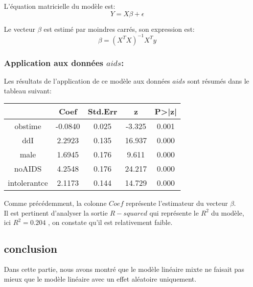 \documentclass{article}
\begin{document}
L'équation matricielle du modèle est:\\
\[Y = X \beta  + \epsilon\]

Le vecteur $\beta$ est estimé par moindres carrés, son expression est: 
\[\beta = (X^T X)^{-1} X^T y\]

\subsubsection{Application aux données $aids$:}

Les résultats de l'application de ce modèle aux données $aids$ sont résumés dans le tableau suivant:
\begin{center}
    \begin{tabular}{|c|c|c|c|c|}
    \hline
         & Coef & Std.Err & z & P>|z|   \\
         \hline 
         obstime & -0.0840 & 0.025 & -3.325 & 0.001\\
         ddI & 2.2923 & 0.135 & 16.937 & 0.000 \\
         male & 1.6945 & 0.176 & 9.611 & 0.000\\
         noAIDS &4.2548 & 0.176 & 24.217 & 0.000\\
         intolerantce  & 2.1173 & 0.144 & 14.729 & 0.000\\
        
         \hline
    \end{tabular}
\end{center}

Comme précédemment, la colonne $Coef$ représente l'estimateur du vecteur $\beta$.\\
Il est pertinent d'analyser la sortie $R-squared$ qui représente le $R^2$ du modèle, ici $R^2 = 0.204$ , on constate qu'il est relativement faible.



\subsection{conclusion}
Dans cette partie, nous avons montré que le modèle linéaire mixte ne faisait pas mieux que le modèle linéaire avec un effet aléatoire uniquement.

\end{document}
